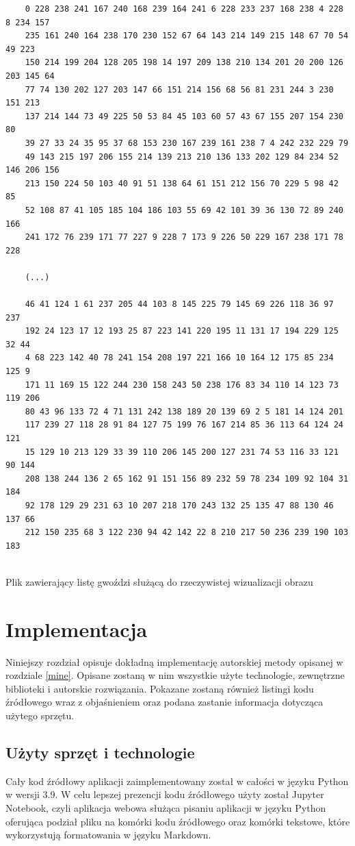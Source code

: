 \documentclass[a4paper, 12pt, polish, twoside]{extreport}
\begin{document}
    \begin{code}[H]
    \begin{lstlisting}
    0 228 238 241 167 240 168 239 164 241 6 228 233 237 168 238 4 228 8 234 157 
    235 161 240 164 238 170 230 152 67 64 143 214 149 215 148 67 70 54 49 223 
    150 214 199 204 128 205 198 14 197 209 138 210 134 201 20 200 126 203 145 64 
    77 74 130 202 127 203 147 66 151 214 156 68 56 81 231 244 3 230 151 213 
    137 214 144 73 49 225 50 53 84 45 103 60 57 43 67 155 207 154 230 80 
    39 27 33 24 35 95 37 68 153 230 167 239 161 238 7 4 242 232 229 79 
    49 143 215 197 206 155 214 139 213 210 136 133 202 129 84 234 52 146 206 156 
    213 150 224 50 103 40 91 51 138 64 61 151 212 156 70 229 5 98 42 85 
    52 108 87 41 105 185 104 186 103 55 69 42 101 39 36 130 72 89 240 166 
    241 172 76 239 171 77 227 9 228 7 173 9 226 50 229 167 238 171 78 228 
    
    (...)
    
    46 41 124 1 61 237 205 44 103 8 145 225 79 145 69 226 118 36 97 237 
    192 24 123 17 12 193 25 87 223 141 220 195 11 131 17 194 229 125 32 44 
    4 68 223 142 40 78 241 154 208 197 221 166 10 164 12 175 85 234 125 9 
    171 11 169 15 122 244 230 158 243 50 238 176 83 34 110 14 123 73 119 206 
    80 43 96 133 72 4 71 131 242 138 189 20 139 69 2 5 181 14 124 201 
    117 239 27 118 28 91 84 127 75 199 76 167 214 85 36 113 64 124 24 121 
    15 129 10 213 129 33 39 110 206 145 200 127 231 74 53 116 33 121 90 144 
    208 138 244 136 2 65 162 91 151 156 89 232 59 78 234 109 92 104 31 184 
    92 178 129 29 231 63 10 207 218 170 243 132 25 135 47 88 130 46 137 66 
    212 150 235 68 3 122 230 94 42 142 22 8 210 217 50 236 239 190 103 183 
    
    \end{lstlisting}
    \caption{Plik zawierający listę gwoździ służącą do rzeczywistej wizualizacji obrazu}
    \label{taco-wiz-txt}
    \end{code}
    
\chapter{Implementacja} \label{imp}
Niniejszy rozdział opisuje dokładną implementację autorskiej metody opisanej w rozdziale \ref{mine}. Opisane zostaną w nim wszystkie użyte technologie, zewnętrzne biblioteki i autorskie rozwiązania. Pokazane zostaną również listingi kodu źródłowego wraz z objaśnieniem oraz podana zastanie informacja dotycząca użytego sprzętu.
    \section{Użyty sprzęt i technologie} \label{imp-technologies}
    Cały kod źródłowy aplikacji zaimplementowany został w całości w języku Python w wersji 3.9. W celu lepszej prezencji kodu źródłowego użyty został Jupyter Notebook, czyli aplikacja webowa służąca pisaniu aplikacji w języku Python oferująca podział pliku na komórki kodu źródłowego oraz komórki tekstowe, które wykorzystują formatowania w języku Markdown.
    
\end{document}
